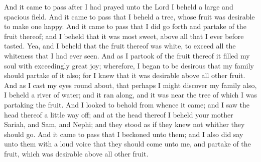 And it came to pass after I had prayed unto the Lord I beheld a large and spacious field.
\bverse \iffalse And it came to pass that I beheld a tree, whose fruit was desirable to make one happy. \fi
And it came to pass that I beheld a tree, whose fruit was desirable to make one happy.
\bverse \iffalse And it came to pass that I did go forth and partake of the fruit thereof; and I beheld that it was most sweet, above all that I ever before tasted. Yea, and I beheld that the fruit thereof was white, to exceed all the whiteness that I had ever seen. \fi
And it came to pass that I did go forth and partake of the fruit thereof; and I beheld that it was most sweet, above all that I ever before tasted. Yea, and I beheld that the fruit thereof was white, to exceed all the whiteness that I had ever seen.
\bverse \iffalse And as I partook of the fruit thereof it filled my soul with exceedingly great joy; wherefore, I began to be desirous that my family should partake of it also; for I knew that it was desirable above all other fruit. \fi
And as I partook of the fruit thereof it filled my soul with exceedingly great joy; wherefore, I began to be desirous that my family should partake of it also; for I knew that it was desirable above all other fruit.
\bverse \iffalse And as I cast my eyes round about, that perhaps I might discover my family also, I beheld a river of water; and it ran along, and it was near the tree of which I was partaking the fruit. \fi
And as I cast my eyes round about, that perhaps I might discover my family also, I beheld a river of water; and it ran along, and it was near the tree of which I was partaking the fruit.
\bverse \iffalse And I looked to behold from whence it came; and I saw the head thereof a little way off; and at the head thereof I beheld your mother Sariah, and Sam, and Nephi; and they stood as if they knew not whither they should go. \fi
And I looked to behold from whence it came; and I saw the head thereof a little way off; and at the head thereof I beheld your mother Sariah, and Sam, and Nephi; and they stood as if they knew not whither they should go.
\bverse \iffalse And it came to pass that I beckoned unto them; and I also did say unto them with a loud voice that they should come unto me, and partake of the fruit, which was desirable above all other fruit. \fi
And it came to pass that I beckoned unto them; and I also did say unto them with a loud voice that they should come unto me, and partake of the fruit, which was desirable above all other fruit.
